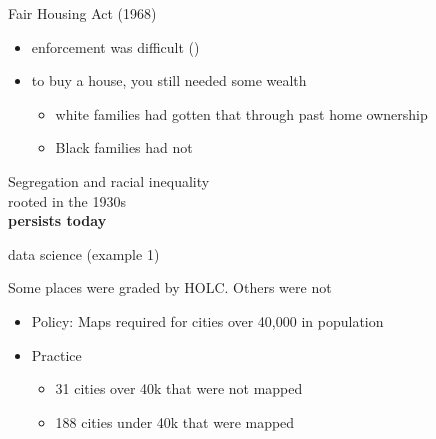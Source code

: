 \documentclass{beamer}
\newcommand\bref[2]{\href{#1}{\color{blue}{#2}}}
\begin{document}
\begin{frame}{Fair Housing Act (1968)}

\begin{itemize}
\item enforcement was difficult (\bref{https://youtu.be/r3Q6EDNRReg?t=34}{video})
\pause
\item to buy a house, you still needed some wealth \pause
\begin{itemize}
\item white families had gotten that through past home ownership \pause
\item Black families had not \pause
\end{itemize}
\end{itemize}
Segregation and racial inequality\\rooted in the 1930s\\\textbf{persists today}

\end{frame}

\begin{frame}

\huge data science (example 1)

\end{frame}


\begin{frame}{Some places were graded by HOLC. Others were not} \pause
\begin{itemize}
\item Policy: Maps required for cities over 40,000 in population \pause
\item Practice
\begin{itemize}
\item 31 cities over 40k that were not mapped
\item 188 cities under 40k that were mapped
\end{itemize}
\end{itemize}
\end{frame}
\end{document}

